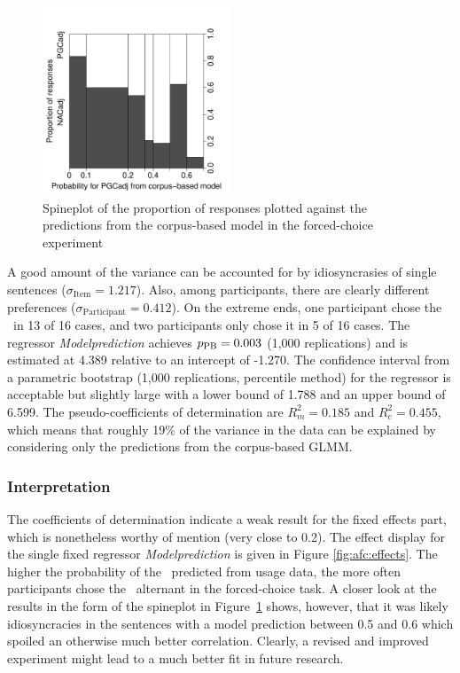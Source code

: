 \begin{figure}[htbp!]
  \centering
  \includegraphics[width=0.5\textwidth]{../R/output/fc_proportions}
  \caption{Spineplot of the proportion of responses plotted against the predictions from the corpus-based model in the forced-choice experiment}
  \label{fig:spines}
\end{figure}

A good amount of the variance can be accounted for by idiosyncrasies of single sentences ($\sigma_{\text{Item}}=1.217$).%
Also, among participants, there are clearly different preferences ($\sigma_{\text{Participant}}=0.412$).
On the extreme ends, one participant chose the \PGCa\ in 13 of 16 cases, and two participants only chose it in 5 of 16 cases.
The regressor \textit{Modelprediction} achieves $p_{\text{PB}}=0.003$ (1,000 replications) and is estimated at 4.389 relative to an intercept of -1.270.
The confidence interval from a parametric bootstrap (1,000 replications, percentile method) for the regressor is acceptable but slightly large with a lower bound of 1.788 and an upper bound of 6.599.
The pseudo-coefficients of determination are $R^2_{m}=0.185$ and $R^2_{c}=0.455$, which means that roughly 19\% of the variance in the data can be explained by considering only the predictions from the corpus-based GLMM.

\subsubsection{Interpretation}

The coefficients of determination indicate a weak result for the fixed effects part, which is nonetheless worthy of mention (very close to 0.2).
The effect display for the single fixed regressor \textit{Modelprediction} is given in Figure \ref{fig:afc:effects}.
The higher the probability of the \PGCa\ predicted from usage data, the more often participants chose the \PGCa\ alternant in the forced-choice task.
A closer look at the results in the form of the spineplot in Figure~\ref{fig:spines} shows, however, that it was likely idiosyncracies in the sentences with a model prediction between 0.5 and 0.6 which spoiled an otherwise much better correlation.
Clearly, a revised and improved experiment might lead to a much better fit in future research.

